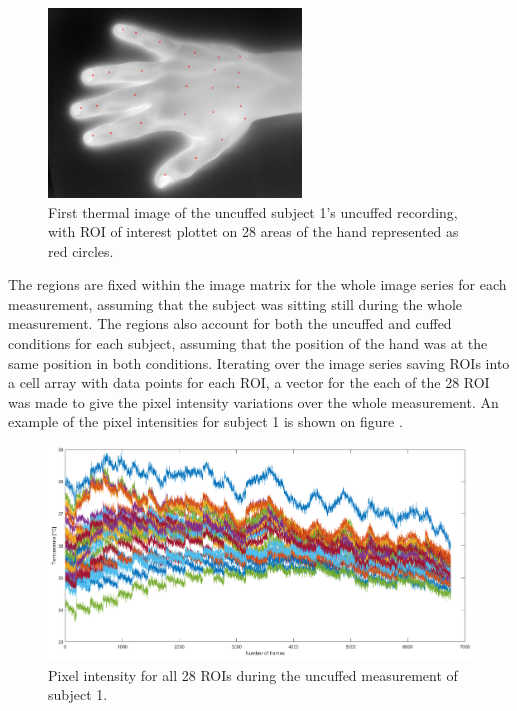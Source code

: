 \begin{figure}[H]
	\includegraphics[width=0.6\textwidth]{figures/roiHand}  %
	\caption{First thermal image of the uncuffed subject 1's uncuffed recording, with ROI of interest plottet on 28 areas of the hand represented as red circles.}
	\label{fig:roiHand}  %
\end{figure}

The regions are fixed within the image matrix for the whole image series for each measurement, assuming that the subject was sitting still during the whole measurement. The regions also account for both the uncuffed and cuffed conditions for each subject, assuming that the position of the hand was at the same position in both conditions. 
Iterating over the image series saving ROIs into a cell array with data points for each ROI, a vector for the each of the 28 ROI was made to give the pixel intensity variations over the whole measurement. 
An example of the pixel intensities for subject 1 is shown on figure .

\begin{figure}[H]
	\includegraphics[width=1\textwidth]{figures/Intensities}  %
	\caption{Pixel intensity for all 28 ROIs during the uncuffed measurement of subject 1.}
	\label{fig:Intensities}  %
\end{figure}

